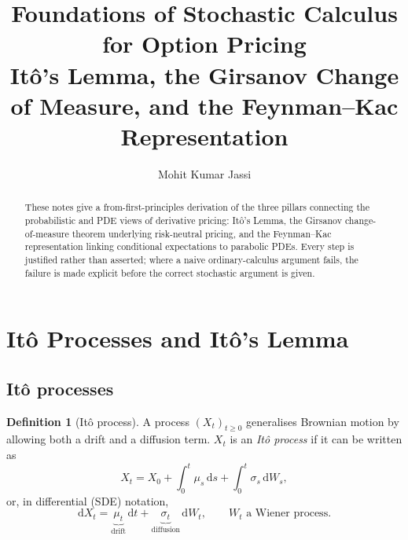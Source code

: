 \documentclass[11pt]{article}
\title{\textbf{Foundations of Stochastic Calculus for Option Pricing}\\
\large Itô's Lemma, the Girsanov Change of Measure, and the Feynman--Kac Representation}
\author{Mohit Kumar Jassi}
\date{}
\theoremstyle{definition}
\newtheorem{definition}[theorem]{Definition}
\theoremstyle{remark}
\newcommand{\dd}{\mathrm{d}}
\begin{document}
\maketitle
\begin{abstract}

\noindent These notes give a from-first-principles derivation of the three pillars connecting the
probabilistic and PDE views of derivative pricing: Itô's Lemma, the Girsanov change-of-measure
theorem underlying risk-neutral pricing, and the Feynman--Kac representation linking conditional
expectations to parabolic PDEs. Every step is justified rather than asserted; where a naive
ordinary-calculus argument fails, the failure is made explicit before the correct stochastic
argument is given.
\end{abstract}

\tableofcontents

\newpage

\section{Itô Processes and Itô's Lemma}

\subsection{Itô processes}

\begin{definition}[Itô process]
A process $(X_t)_{t\ge 0}$ generalises Brownian motion by allowing both a drift and a diffusion
term. $X_t$ is an \emph{Itô process} if it can be written as
\[
X_t = X_0 + \int_0^t \mu_s \,\dd s + \int_0^t \sigma_s \,\dd W_s,
\]
or, in differential (SDE) notation,
\[
\dd X_t = \underbrace{\mu_t}_{\text{drift}}\,\dd t + \underbrace{\sigma_t}_{\text{diffusion}}\,\dd W_t,
\qquad W_t \text{ a Wiener process.}
\]
\end{definition}
\end{document}
